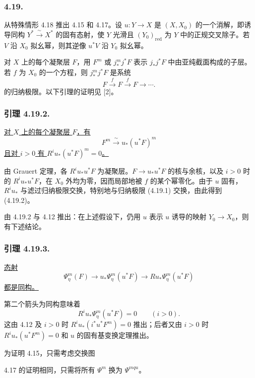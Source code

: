 \subsubsection*{4.19.}
从特殊情形 4.18 推出 4.15 和 4.17。设 $u:Y\longrightarrow X$ 是 $(X,X_0)$ 的一个消解，即诱导同构 $Y^*\xrightarrow{\ \sim\ }X^*$ 的固有态射，使 $Y$ 光滑且 $(Y_0)_{\mathrm{red}}$ 为 $Y$ 中的正规交叉除子。若 $V$ 沿 $X_0$ 拟幺幂，则其逆像 $u^*V$ 沿 $Y_0$ 拟幺幂。

对 $X$ 上的每个凝聚层 $F$，用 $F^m$ 或 $j_*^m j^*F$ 表示 $j_*j^*F$ 中由亚纯截面构成的子层。若 $f$ 为 $X_0$ 的一个方程，则 $j_*^m j^*F$ 是系统
\begin{equation}\tag{4.19.1}
F\xrightarrow{f}F\xrightarrow{f}F\longrightarrow\cdots.
\end{equation}
的归纳极限。以下引理的证明见 [2]。

\subsubsection*{引理 4.19.2.}
\underline{对 $X$ 上的每个凝聚层 $F$，有}
\[
F^m\xrightarrow{\ \sim\ }u_*(u^*F)^m
\]
\underline{且对 $i>0$ 有 $R^iu_*(u^*F)^m=0$。}

由 Grauert 定理，各 $R^iu_*u^*F$ 为凝聚层。$F\longrightarrow u_*u^*F$ 的核与余核，以及 $i>0$ 时的 $R^iu_*u^*F$，在 $X_0$ 外均为零，因而局部地被 $f$ 的某个幂零化。由于 $u$ 固有，$R^iu_*$ 与滤过归纳极限交换，特别地与归纳极限 (4.19.1) 交换，由此得到 (4.19.2)。

由 4.19.2 与 4.12 推出：在上述假设下，仍用 $u$ 表示 $u$ 诱导的映射 $Y_0\to X_0$，则有下述结论。

\subsubsection*{引理 4.19.3.}
\underline{态射}
\[
\Psi_\eta^m(F)\longrightarrow
u_*\Psi_\eta^m(u^*F)\longrightarrow
Ru_*\Psi_\eta^m(u^*F)
\]
\underline{都是同构。}

第二个箭头为同构意味着
\[
R^iu_*\Psi_\eta^m(u^*F)=0\qquad(i>0).
\]
这由 4.12 及 $i>0$ 时 $R^iu_*(i^*u^*F^m)=0$ 推出；后者又由 $i>0$ 时 $R^iu_*(u^*F^m)=0$ 和 $u$ 的固有基变换定理推出。

为证明 4.15，只需考虑交换图
\begin{center}
\end{center}
4.17 的证明相同，只需将所有 $\Psi^m$ 换为 $\Psi^{mqu}$。

